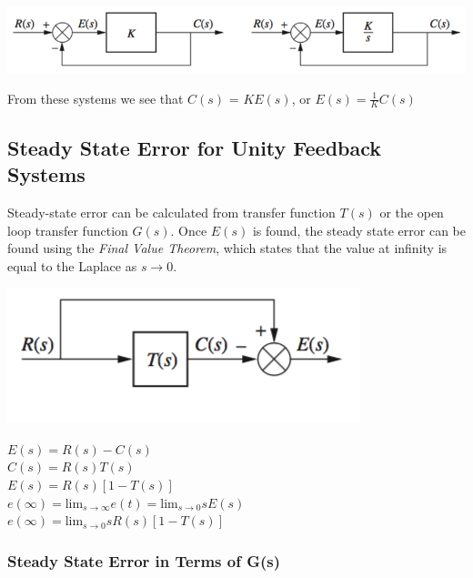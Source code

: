 \documentclass[11pt]{article}
\begin{document}
    \begin{center}
        \includegraphics[width=300 px]{img/integrator} \\
    \end{center}

    From these systems we see that $C(s)$ = $KE(s)$, or $E(s) = \frac{1}{K}C(s)$

    \subsection{Steady State Error for Unity Feedback Systems}

    Steady-state error can be calculated from transfer function $T(s)$ or the open loop transfer function $G(s)$. Once $E(s)$ is found, the steady state error can be found using the \textit{Final Value Theorem}, which states that the value at infinity is equal to the Laplace as $s \rightarrow 0$.

    \begin{center}
        \includegraphics[width=300 px]{img/closedlooperror} \\
    \end{center}

    \begin{center}
        $E(s) = R(s) - C(s)$ \\
        $C(s) = R(s)T(s)$ \\ 
        $E(s) = R(s)[1 - T(s)]$ \\
        $e(\infty) = \text{lim}_{s\rightarrow \infty}  e(t) = \text{lim}_{s\rightarrow 0}  sE(s)$ \\ 
        $e(\infty) = \text{lim}_{s\rightarrow 0} sR(s)[1 - T(s)]$ \\
    \end{center}

    \subsubsection{Steady State Error in Terms of G(s)}
\end{document}
